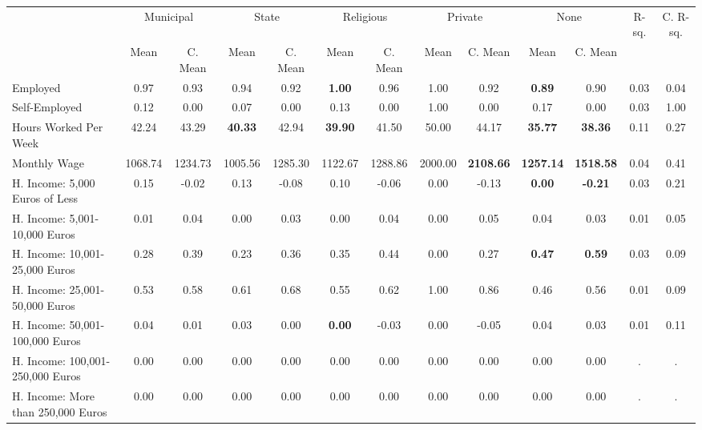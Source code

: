 \begin{tabular}{l c c c c c c c c c c c c}
\toprule
& \multicolumn{2}{c}{Municipal} & \multicolumn{2}{c}{State} & \multicolumn{2}{c}{Religious} & \multicolumn{2}{c}{Private} & \multicolumn{2}{c}{None} & R-sq. & C. R-sq. \\
& \scriptsize Mean & \scriptsize C. Mean & \scriptsize Mean & \scriptsize C. Mean & \scriptsize Mean & \scriptsize C. Mean & \scriptsize Mean & \scriptsize C. Mean & \scriptsize Mean & \scriptsize C. Mean & & \\
\midrule
Employed &      0.97 & 0.93 &      0.94 & 0.92 & \textbf{     1.00} & 0.96 &      1.00 & 0.92 & \textbf{     0.89} & 0.90 &      0.03 &      0.04 \\
Self-Employed &      0.12 & 0.00 &      0.07 & 0.00 &      0.13 & 0.00 &      1.00 & 0.00 &      0.17 & 0.00 &      0.03 &      1.00 \\
Hours Worked Per Week &     42.24 & 43.29 & \textbf{    40.33} & 42.94 & \textbf{    39.90} & 41.50 &     50.00 & 44.17 & \textbf{    35.77} & \textbf{    38.36} &      0.11 &      0.27 \\
Monthly Wage &   1068.74 & 1234.73 &   1005.56 & 1285.30 &   1122.67 & 1288.86 &   2000.00 & \textbf{  2108.66} & \textbf{  1257.14} & \textbf{  1518.58} &      0.04 &      0.41 \\
H. Income: 5,000 Euros of Less &      0.15 & -0.02 &      0.13 & -0.08 &      0.10 & -0.06 &      0.00 & -0.13 & \textbf{     0.00} & \textbf{    -0.21} &      0.03 &      0.21 \\
H. Income: 5,001-10,000 Euros &      0.01 & 0.04 &      0.00 & 0.03 &      0.00 & 0.04 &      0.00 & 0.05 &      0.04 & 0.03 &      0.01 &      0.05 \\
H. Income: 10,001-25,000 Euros &      0.28 & 0.39 &      0.23 & 0.36 &      0.35 & 0.44 &      0.00 & 0.27 & \textbf{     0.47} & \textbf{     0.59} &      0.03 &      0.09 \\
H. Income: 25,001-50,000 Euros &      0.53 & 0.58 &      0.61 & 0.68 &      0.55 & 0.62 &      1.00 & 0.86 &      0.46 & 0.56 &      0.01 &      0.09 \\
H. Income: 50,001-100,000 Euros &      0.04 & 0.01 &      0.03 & 0.00 & \textbf{     0.00} & -0.03 &      0.00 & -0.05 &      0.04 & 0.03 &      0.01 &      0.11 \\
H. Income: 100,001-250,000 Euros &      0.00 & 0.00 &      0.00 & 0.00 &      0.00 & 0.00 &      0.00 & 0.00 &      0.00 & 0.00 &         . &         . \\
H. Income: More than 250,000 Euros &      0.00 & 0.00 &      0.00 & 0.00 &      0.00 & 0.00 &      0.00 & 0.00 &      0.00 & 0.00 &         . &         . \\
\bottomrule
\end{tabular}
